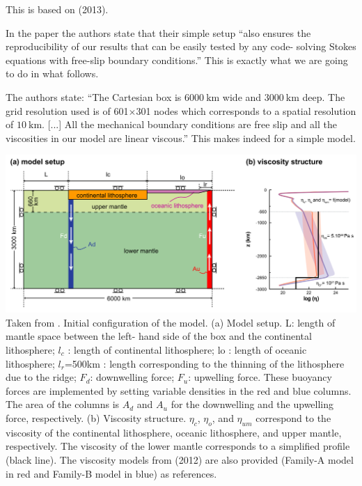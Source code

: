 
This \stone is based on \textcite{yahb13} (2013). 

In the paper the authors state that their simple setup
``also ensures the reproducibility of our results that can be easily tested by any code-
solving Stokes equations with free-slip boundary conditions.''
This is exactly what we are going to do in what follows.

The authors state: ``The Cartesian box is $6000~\si{\km}$ wide and $3000~\si{\km}$
deep. The grid resolution used is of 601$\times$301 nodes which
corresponds to a spatial resolution of $10~\si{\km}$. [...] 
All the mechanical boundary conditions are free slip and all the viscosities 
in our model are linear viscous.''
This makes indeed for a simple model.

\begin{center}
\includegraphics[width=14cm]{python_codes/fieldstone_143/images/yahb13_a}\\
{\captionfont 
Taken from \cite{yahb13}. Initial configuration of the model. (a) Model setup. L: length of mantle space between the left-
hand side of the box and the continental lithosphere; $l_c$ : length of continental lithosphere; lo : length of
oceanic lithosphere; $l_r$=500km : length corresponding to the thinning of the lithosphere due to the ridge; 
$F_d$: downwelling force; $F_u$: upwelling force. These buoyancy forces are implemented by setting variable
densities in the red and blue columns. The area of the columns is $A_d$ and $A_u$ for the downwelling and the
upwelling force, respectively. (b) Viscosity structure. $\eta_c$, $\eta_o$, and $\eta_{um}$ correspond
to the viscosity of the continental lithosphere, oceanic lithosphere, and upper mantle, respectively. The
viscosity of the lower mantle corresponds to a simplified profile (black line). The viscosity models from
\cite{civs12} (2012) are also provided (Family-A model in red and Family-B model in blue) as references. }
\end{center}

